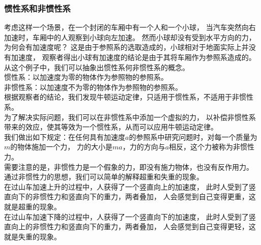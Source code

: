 \documentclass[UTF8]{ctexart}
\begin{document}
\subsubsection{惯性系和非惯性系}
    考虑这样一个场景，在一个封闭的车厢中有一个人和一个小球，
    当汽车突然向右加速时，车厢中的人观察到小球向左加速。
    然而小球却没有受到水平方向的力，为何会有加速度呢？
    这是由于参照系的选取造成的，小球相对于地面实际上并没有加速度，
    观察者得出小球有加速度的结论是由于其将车厢作为参照系造成的。\\[6mm]
    从这个例子中，我们可以抽象出惯性系何非惯性系的概念。\\[2mm]
    惯性系：以加速度为零的物体作为参照物的参照系。\\[2mm]
    非惯性系：以加速度不为零的物体作为参照物的参照系。\\[2mm]
    根据观察者的结论，我们发现牛顿运动定律，只适用于惯性系，不适用于非惯性系。\\[6mm]
    为了解决实际问题，我们可以在非惯性系中添加一个虚拟的力，
    以补偿非惯性系带来的效应，使其等效为一个惯性系，从而可以应用牛顿运动定律。\\[3mm]
    我们做出如下规定：在任何具有加速度$a$的参照系中研究问题时，对每一个质量为$m$的物体施加一个力，
    力的大小是$ma$，力的方向与$a$相反，这个力被称为非惯性力。\\[3mm]
    需要注意的是，非惯性力是一个假象的力，即没有施力物体，也没有反作用力。\\[7mm]
    通过非惯性力的思想，我们可以简单的解释超重和失重的现象。\\[3mm]
    在过山车加速上升的过程中，人获得了一个竖直向上的加速度，
    此时人受到了竖直向下的非惯性力和竖直向下的重力，两者叠加，
    人会感觉到自己变得更重，这就是超重的现象。\\[3mm]
    在过山车加速下降的过程中，人获得了一个竖直向下的加速度，
    此时人受到了竖直向上的非惯性力和竖直向下的重力，两者叠加，
    人会感觉到自己变得更轻，这就是失重的现象。

\newpage
\end{document}
